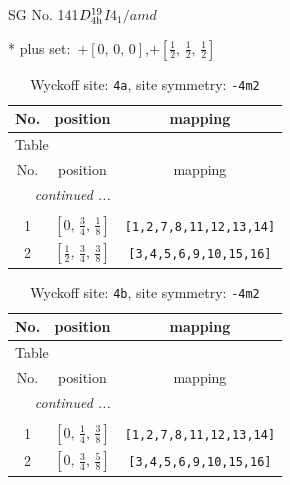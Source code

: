\documentclass[fleqn,8pt]{jsarticle}
\begin{document}
\setcounter{MaxMatrixCols}{32}

\renewcommand{\tablename}{Table~}
\renewcommand{\figurename}{Figure~}
\begin{center}
\LARGE
SG No. 141\quad$D_{\rm 4h}^{19}$\quad$I4_1/amd$\quad[ tetragonal ]
\end{center}
* plus set:\,\,\,$+\left[ 0,\, 0,\, 0 \right]$,\quad $+\left[ \frac{1}{2},\, \frac{1}{2},\, \frac{1}{2} \right]$
\renewcommand{\arraystretch}{1.2}
\begin{longtable}{ccc}
\caption{Wyckoff site: {\tt 4a}, site symmetry: {\tt -4m2}}
 \\
 \hline \hline
No. & position & mapping \\ \hline \endfirsthead

\multicolumn{2}{l}{\tablename\ \thetable{}} \\
 \hline \hline
No. & position & mapping \\ \hline \endhead

 \hline \hline
\multicolumn{2}{r}{\footnotesize\it continued ...} \\ \endfoot

 \hline \hline
\multicolumn{2}{r}{} \\ \endlastfoot

1 & $\left[ 0,\, \frac{3}{4},\, \frac{1}{8} \right]$ & {\tt [1,2,7,8,11,12,13,14]} \\ \hline
2 & $\left[ \frac{1}{2},\, \frac{3}{4},\, \frac{3}{8} \right]$ & {\tt [3,4,5,6,9,10,15,16]} \\
\end{longtable}
\renewcommand{\arraystretch}{1.2}
\begin{longtable}{ccc}
\caption{Wyckoff site: {\tt 4b}, site symmetry: {\tt -4m2}}
 \\
 \hline \hline
No. & position & mapping \\ \hline \endfirsthead

\multicolumn{2}{l}{\tablename\ \thetable{}} \\
 \hline \hline
No. & position & mapping \\ \hline \endhead

 \hline \hline
\multicolumn{2}{r}{\footnotesize\it continued ...} \\ \endfoot

 \hline \hline
\multicolumn{2}{r}{} \\ \endlastfoot

1 & $\left[ 0,\, \frac{1}{4},\, \frac{3}{8} \right]$ & {\tt [1,2,7,8,11,12,13,14]} \\ \hline
2 & $\left[ 0,\, \frac{3}{4},\, \frac{5}{8} \right]$ & {\tt [3,4,5,6,9,10,15,16]} \\
\end{longtable}
\end{document}
